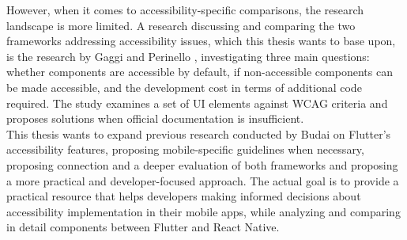However, when it comes to accessibility-specific comparisons, the research landscape is more limited. 
A research discussing and comparing the two frameworks addressing accessibility issues, which this thesis wants to base upon, is the research by Gaggi and Perinello \cite{perinello2024accessibility}, investigating three main questions: whether components are accessible by default, if non-accessible components can be made accessible, and the development cost in terms of additional code required. The study examines a set of UI elements against WCAG criteria and proposes solutions when official documentation is insufficient. \\

This thesis wants to expand previous research conducted by Budai \cite{budai2024mobile} on Flutter's accessibility features, proposing mobile-specific guidelines when necessary, proposing connection and a deeper evaluation of both frameworks and proposing a more practical and developer-focused approach. The actual goal is to provide a practical resource that helps developers making informed decisions about accessibility implementation in their mobile apps, while analyzing and comparing in detail components between Flutter and React Native.

\newpage